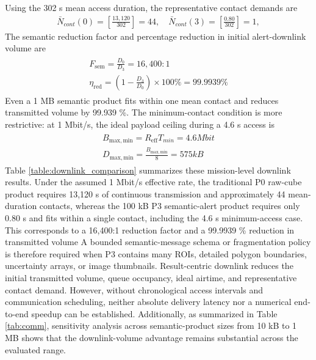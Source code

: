 \documentclass[a4paper,fleqn]{cas-dc}
\begin{document}
Using the 302 s mean access duration, the representative contact demands are
\begin{eqnarray}
	\bar{N}_{cont}(0) = \left[\frac{13,120}{302}\right] = 44, \quad \bar{N}_{cont}(3) = \left[\frac{0.80}{302}\right] =1,
\end{eqnarray}
The semantic reduction factor and percentage reduction in initial alert-downlink volume are
\begin{eqnarray}
	\begin{aligned}
	F_{\mathrm{sem}} = \frac{D_0}{D_3} = 16,400:1\\
	\eta_{\mathrm{red}} = \left(1 - \frac{D_3}{D_0}\right) \times 100 \% = 99.9939 \%
	\end{aligned}
\end{eqnarray}
Even a 1 MB semantic product fits within one mean contact and reduces transmitted volume by 99.939 \%. The minimum-contact condition is more restrictive: at 1 Mbit/s, the ideal payload ceiling during a 4.6 s access is
\begin{eqnarray}
	\begin{aligned}
	B_{\mathrm{max,min}} = R_{\mathrm{eff}}T_{min} = 4.6 Mbit\\
	D_{\mathrm{max,min}} = \frac{B_{\mathrm{max,min}}}{8} = 575 kB
	\end{aligned}
\end{eqnarray}
Table \ref{table:downlink_comparison} summarizes these mission-level downlink results. Under the assumed 1 Mbit/s effective rate, the traditional P0 raw-cube product requires 13,120 s of continuous transmission and approximately 44 mean-duration contacts, whereas the 100 kB P3 semantic-alert product requires only 0.80 s and fits within a single contact, including the 4.6 s minimum-access case. This corresponds to a 16,400:1 reduction factor and a 99.9939 \% reduction in transmitted volume
A bounded semantic-message schema or fragmentation policy is therefore required when P3 contains many ROIs, detailed polygon boundaries, uncertainty arrays, or image thumbnails.
Result-centric downlink reduces the initial transmitted volume, queue occupancy, ideal airtime, and representative contact demand. However, without chronological access intervals and communication scheduling, neither absolute delivery latency nor a numerical end-to-end speedup can be established. Additionally, as summarized in Table \ref{tab:comm}, sensitivity analysis across semantic-product sizes from 10 kB to 1 MB shows that the downlink-volume advantage remains substantial across the evaluated range.
\end{document}
